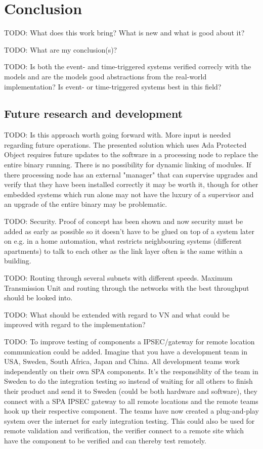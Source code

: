 \chapter{Conclusion}\label{ch:conclusion}
TODO: What does this work bring? What is new and what is good about it?

TODO: What are my conclusion(s)?

TODO: Is both the event- and time-triggered systems verified correcly with the
models and are the models good abstractions from the real-world implementation?
Is event- or time-triggered systems best in this field?

\section{Future research and development}
TODO: Is this approach worth going forward with. More input is needed regarding
future operations. The presented solution which uses Ada Protected Object
requires future updates to the software in a processing node to replace the
entire binary running. There is no possibility for dynamic linking of modules.
If there processing node has an external "manager" that can supervise upgrades
and verify that they have been installed correctly it may be worth it, though
for other embedded systems which run alone may not have the luxury of a
supervisor and an upgrade of the entire binary may be problematic.

TODO: Security. Proof of concept has been shown and now security must be added
as early as possible so it doesn't have to be glued on top of a system later on
e.g. in a home automation, what restricts neighbouring systems (different
apartments) to talk to each other as the link layer often is the same within a
building.

TODO: Routing through several subnets with different speeds. Maximum
Transmission Unit and routing through the networks with the best throughput
should be looked into.

TODO: What should be extended with regard to VN and what could be improved with
regard to the implementation?

TODO: To improve testing of components a IPSEC/gateway for remote location
communication could be added. Imagine that you have a development team in USA,
Sweden, South Africa, Japan and China. All development teams work independently
on their own SPA components. It's the responsiblity of the team in Sweden to do
the integration testing so instead of waiting for all others to finish their
product and send it to Sweden (could be both hardware and software), they
connect with a SPA IPSEC gateway to all remote locations and the remote teams
hook up their respective component. The teams have now created a plug-and-play
system over the internet for early integration testing. This could also be used
for remote validation and verification, the verifier connect to a remote site
which have the component to be verified and can thereby test remotely.

